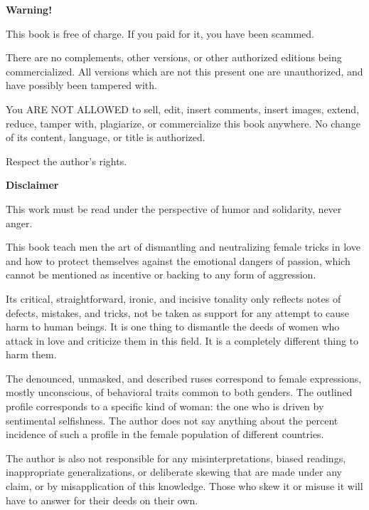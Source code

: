 \centering \large{\textbf{Warning!}}

\justifying \small

\par This book is free of charge. If you paid for it, you have been scammed.

\par There are no complements, other versions, or other authorized editions being commercialized. All versions which are not this present one are unauthorized, and have possibly been tampered with.

\par You ARE NOT ALLOWED to sell, edit, insert comments, insert images, extend, reduce, tamper with, plagiarize, or commercialize this book anywhere. No change of its content, language, or title is authorized.

\par Respect the author's rights.

\centering \large{\textbf{Disclaimer}}

\justifying \small

\begin{bfseries}
\par This work must be read under the perspective of humor and solidarity, never anger.

\par This book teach men the art of dismantling and neutralizing female tricks in love and how to protect themselves against the emotional dangers of passion, which cannot be mentioned as incentive or backing to any form of aggression.

\par Its critical, straightforward, ironic, and incisive tonality only reflects notes of defects, mistakes, and tricks, not be taken as support for any attempt to cause harm to human beings. It is one thing to dismantle the deeds of women who attack in love and criticize them in this field. It is a completely different thing to harm them.

\par The denounced, unmasked, and described ruses correspond to female expressions, mostly unconscious, of behavioral traits common to both genders. The outlined profile corresponds to a specific kind of woman: the one who is driven by sentimental selfishness. The author does not say anything about the percent incidence of such a profile in the female population of different countries.

\par The author is also not responsible for any misinterpretations, biased readings, inappropriate generalizations, or deliberate skewing that are made under any claim, or by misapplication of this knowledge. Those who skew it or misuse it will have to answer for their deeds on their own.
\end{bfseries}